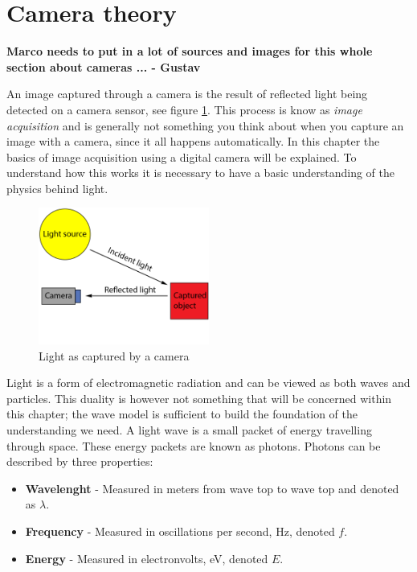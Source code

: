 \section{Camera theory}
\textbf{Marco needs to put in a lot of sources and images for this whole section about cameras ... - Gustav}

An image captured through a camera is the result of reflected light being detected on a camera sensor, see figure \ref{fig:light_cam}. This process is know as \textit{image acquisition} and is generally not something you think about when you capture an image with a camera, since it all happens automatically. In this chapter the basics of image acquisition using a digital camera will be explained. To understand how this works it is necessary to have a basic understanding of the physics behind light.

\begin{figure}[htbp] 
\centering 
\includegraphics[width=0.5\textwidth]{Pictures/Theory/light_from_sun.png} 
\caption{Light as captured by a camera} 
\label{fig:light_cam} 
\end{figure}

Light is a form of electromagnetic radiation and can be viewed as both waves and particles. This duality is however not something that will be concerned within this chapter; the wave model is sufficient to build the foundation of the understanding we need. A light wave is a small packet of energy travelling through space. These energy packets are known as photons. Photons can be described by three properties:

\begin{itemize}
\item \textbf{Wavelenght} - Measured in meters from wave top to wave top and denoted as $\lambda$.
\item \textbf{Frequency} - Measured in oscillations per second, Hz, denoted $f$.
\item \textbf{Energy} - Measured in electronvolts, eV, denoted $E$.
\end{itemize}

